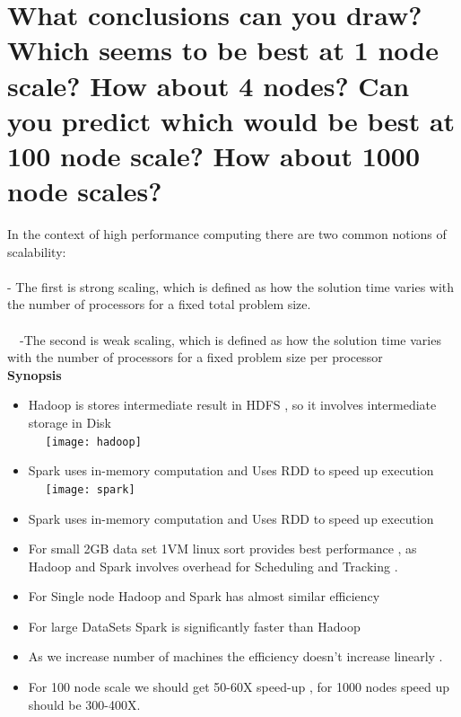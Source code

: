 \documentclass[3pt]{article}
\begin{document}
\section{What conclusions can you draw? Which seems to be best at 1 node scale? How about 4 nodes? Can you predict which would be best at 100 node scale? How about 1000 node scales?} 

In the context of high performance computing there are two common notions of scalability: \\
\\
- The first is strong scaling, which is defined as how the solution time varies with the number of processors for a fixed total problem size. \\
\\
~~-The second is weak scaling, which is defined as how the solution time varies with the number of processors for a fixed problem size per processor \\


\textbf{Synopsis}

\begin{itemize}

\item Hadoop  is stores intermediate result in HDFS , so it involves intermediate storage in Disk 
\\
~~ \texttt{[image: hadoop]}

\item Spark uses in-memory computation and Uses RDD to speed up execution
\\
~~ \texttt{[image: spark]}

\item Spark uses in-memory computation and Uses RDD to speed up execution

\item For small 2GB data set 1VM linux sort provides best performance , as Hadoop and Spark involves overhead for Scheduling and Tracking .

\item For Single node Hadoop and Spark has almost similar efficiency

\item For large DataSets Spark is significantly faster than Hadoop

\item As we increase number of machines the efficiency doesn't increase linearly .

\item For 100 node scale we should get 50-60X speed-up , for 1000 nodes speed up should be 300-400X.

\end{itemize}
\end{document}
